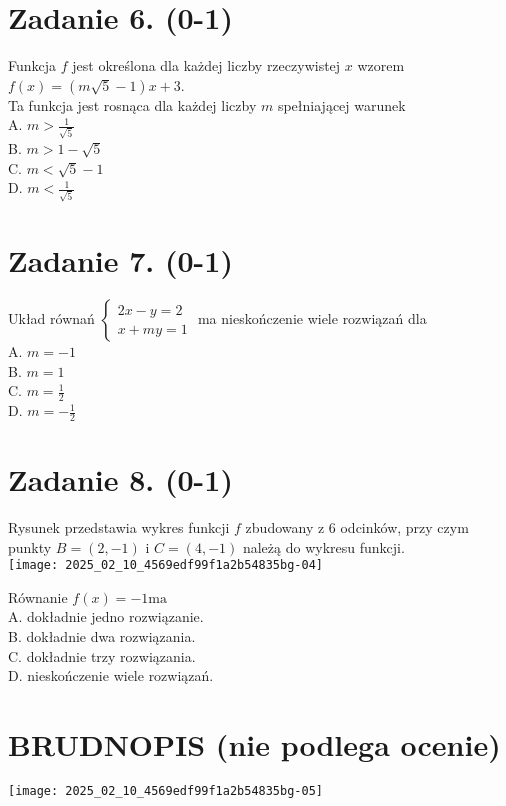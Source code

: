 \documentclass[10pt]{article}
\begin{document}
\section*{Zadanie 6. (0-1)}
Funkcja \(f\) jest określona dla każdej liczby rzeczywistej \(x\) wzorem \(f(x)=(m \sqrt{5}-1) x+3\).\\
Ta funkcja jest rosnąca dla każdej liczby \(m\) spełniającej warunek\\
A. \(m>\frac{1}{\sqrt{5}}\)\\
B. \(m>1-\sqrt{5}\)\\
C. \(m<\sqrt{5}-1\)\\
D. \(m<\frac{1}{\sqrt{5}}\)

\section*{Zadanie 7. (0-1)}
Układ równań \(\left\{\begin{array}{l}2 x-y=2 \\ x+m y=1\end{array}\right.\) ma nieskończenie wiele rozwiązań dla\\
A. \(m=-1\)\\
B. \(m=1\)\\
C. \(m=\frac{1}{2}\)\\
D. \(m=-\frac{1}{2}\)

\section*{Zadanie 8. (0-1)}
Rysunek przedstawia wykres funkcji \(f\) zbudowany z 6 odcinków, przy czym punkty \(B=(2,-1)\) i \(C=(4,-1)\) należą do wykresu funkcji.\\
\texttt{[image: 2025\_02\_10\_4569edf99f1a2b54835bg-04]}

Równanie \(f(x)=-1 \mathrm{ma}\)\\
A. dokładnie jedno rozwiązanie.\\
B. dokładnie dwa rozwiązania.\\
C. dokładnie trzy rozwiązania.\\
D. nieskończenie wiele rozwiązań.

\section*{BRUDNOPIS (nie podlega ocenie)}
\begin{center}
\texttt{[image: 2025\_02\_10\_4569edf99f1a2b54835bg-05]}
\end{center}
\end{document}
